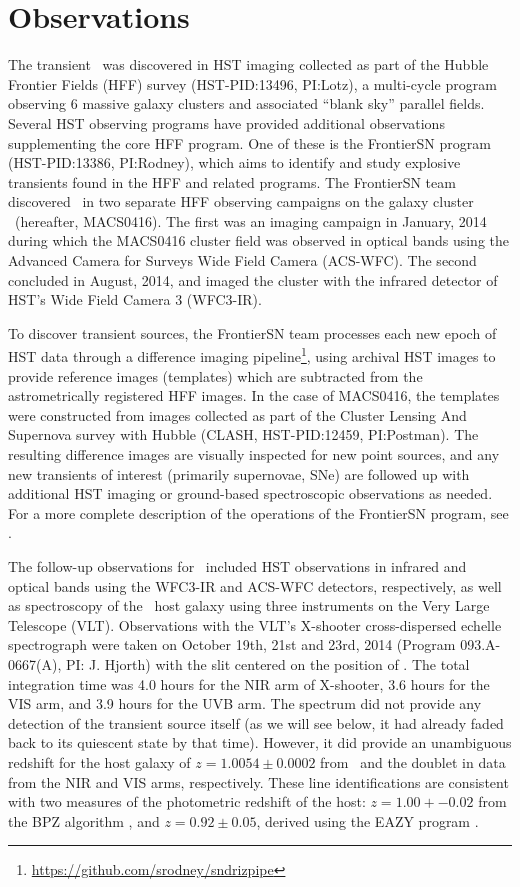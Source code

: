 \section{Observations}\label{sec:Observations}

The transient \spock\ was discovered in HST imaging collected as part
of the Hubble Frontier Fields (HFF) survey (HST-PID:13496, PI:Lotz), a
multi-cycle program observing 6 massive galaxy clusters and associated
``blank sky'' parallel fields.  Several HST observing programs have
provided additional observations supplementing the core HFF program.
One of these is the FrontierSN program (HST-PID:13386, PI:Rodney),
which aims to identify and study explosive transients found in the HFF
and related programs.  The FrontierSN team discovered \spock\ in two
separate HFF observing campaigns on the galaxy cluster
\ (hereafter, MACS0416).  The first was an imaging campaign
in January, 2014 during which the MACS0416 cluster field was observed
in optical bands using the Advanced Camera for Surveys Wide Field
Camera (ACS-WFC).  The second concluded in August, 2014, and imaged
the cluster with the infrared detector of HST's Wide Field Camera 3
(WFC3-IR).

To discover transient sources, the FrontierSN team processes each new
epoch of HST data through a difference imaging
pipeline\footnote{\url{https://github.com/srodney/sndrizpipe}}, using
archival HST images to provide reference images (templates) which are
subtracted from the astrometrically registered HFF images. In the case
of MACS0416, the templates were constructed from images collected as
part of the Cluster Lensing And Supernova survey with Hubble (CLASH,
HST-PID:12459, PI:Postman). The resulting difference images are
visually inspected for new point sources, and any new transients of
interest (primarily supernovae, SNe) are followed up with additional
HST imaging or ground-based spectroscopic observations as needed.  For
a more complete description of the operations of the FrontierSN
program, see \citet{Rodney:2015a}.

The follow-up observations for \spock\ included HST observations in
infrared and optical bands using the WFC3-IR and ACS-WFC detectors,
respectively, as well as spectroscopy of the \spock\ host galaxy using
three instruments on the Very Large Telescope (VLT).   Observations with the VLT's
X-shooter cross-dispersed echelle spectrograph \citep{Vernet:2011}
were taken on October 19th, 21st and 23rd, 2014 (Program
093.A-0667(A), PI: J. Hjorth) with the slit centered on the position
of .  The total integration time was 4.0 hours for the NIR arm
of X-shooter, 3.6 hours for the VIS arm, and 3.9 hours for the UVB
arm.  The spectrum did not provide any detection of the transient
source itself (as we will see below, it had already faded back to its
quiescent state by that time).  However, it did provide an unambiguous
redshift for the host galaxy of $z=1.0054\pm0.0002$ from \Ha\ and the
 doublet in data from the NIR and VIS arms,
respectively.  These line identifications are consistent with two
measures of the photometric redshift of the host: $z=1.00+-0.02$ from
the BPZ algorithm \citep{Benitez:2000}, and $z=0.92\pm0.05$, derived
using the EAZY program \citep{Brammer:2008}.

